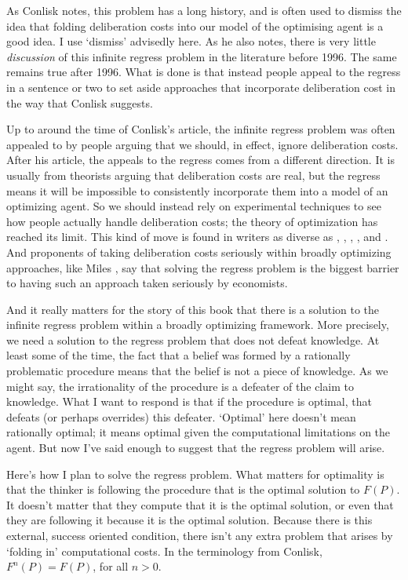 \documentclass[11pt,]{book}
\begin{document}
As Conlisk notes, this problem has a long history, and is often used to dismiss the idea that folding deliberation costs into our model of the optimising agent is a good idea. I use `dismiss' advisedly here. As he also notes, there is very little \emph{discussion} of this infinite regress problem in the literature before 1996. The same remains true after 1996. What is done is that instead people appeal to the regress in a sentence or two to set aside approaches that incorporate deliberation cost in the way that Conlisk suggests.

Up to around the time of Conlisk's article, the infinite regress problem was often appealed to by people arguing that we should, in effect, ignore deliberation costs. After his article, the appeals to the regress comes from a different direction. It is usually from theorists arguing that deliberation costs are real, but the regress means it will be impossible to consistently incorporate them into a model of an optimizing agent. So we should instead rely on experimental techniques to see how people actually handle deliberation costs; the theory of optimization has reached its limit. This kind of move is found in writers as diverse as \citet{GigerenzerSelton2001}, \citet{Odell2002}, \citet{Pingle2006}, \citet{ManganEtAl2010}, \citet{OgakiTanaka2017} and \citet{Chakravarti2017}. And proponents of taking deliberation costs seriously within broadly optimizing approaches, like Miles \citet{Kimball2015}, say that solving the regress problem is the biggest barrier to having such an approach taken seriously by economists.

And it really matters for the story of this book that there is a solution to the infinite regress problem within a broadly optimizing framework. More precisely, we need a solution to the regress problem that does not defeat knowledge. At least some of the time, the fact that a belief was formed by a rationally problematic procedure means that the belief is not a piece of knowledge. As we might say, the irrationality of the procedure is a defeater of the claim to knowledge. What I want to respond is that if the procedure is optimal, that defeats (or perhaps overrides) this defeater. `Optimal' here doesn't mean rationally optimal; it means optimal given the computational limitations on the agent. But now I've said enough to suggest that the regress problem will arise.

Here's how I plan to solve the regress problem. What matters for optimality is that the thinker is following the procedure that is the optimal solution to \(F(P)\). It doesn't matter that they compute that it is the optimal solution, or even that they are following it because it is the optimal solution. Because there is this external, success oriented condition, there isn't any extra problem that arises by `folding in' computational costs. In the terminology from Conlisk, \(F^n(P) = F(P)\), for all \(n > 0\).
\end{document}
